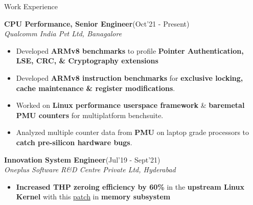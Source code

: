 \documentclass{resume}
\newcommand{\sepval}{-0.5em}
\begin{document}
\begin{rSection}{Work Experience}

\vspace{-.4cm}
 
\item{\bf {\bf CPU Performance, Senior Engineer}}\hfill{(Oct'21 - Present)}\\
	\emph{Qualcomm India Pvt Ltd, Banagalore}\\
[-0.4cm]

\begin{itemize}[leftmargin=*]

	\itemsep \sepval

	
	\item Developed {\bf ARMv8 benchmarks} to profile {\bf Pointer Authentication, LSE, CRC, \& Cryptography extensions}

	\item Developed {\bf ARMv8 instruction benchmarks} for {\bf exclusive locking, cache maintenance \& register modifications}.

	\item Worked on {\bf Linux performance userspace framework} \& {\bf baremetal PMU counters} for multiplatform benchsuite.

	\item Analyzed multiple counter data from {\bf PMU} on laptop grade processors to {\bf catch pre-silicon hardware bugs}.
	
\end{itemize}
\vspace{-.2cm}

\item{\bf {\bf Innovation System Engineer}}\hfill{(Jul'19 - Sept'21)}\\
	\emph{Oneplus Software R\&D Centre Private Ltd, Hyderabad}\\
[-0.4cm]

\begin{itemize}[leftmargin=*]

	\itemsep \sepval

	\item {\bf Increased THP zeroing efficiency by 60\%} in the {\bf upstream
		Linux Kernel} with this
		\href{https://github.com/hnaz/linux-mm/commit/8d9c9dbbeb54b980971085f1696758389e5d0675}{patch}
		in {\bf memory subsystem}


\end{itemize}
\end{rSection}
\end{document}

